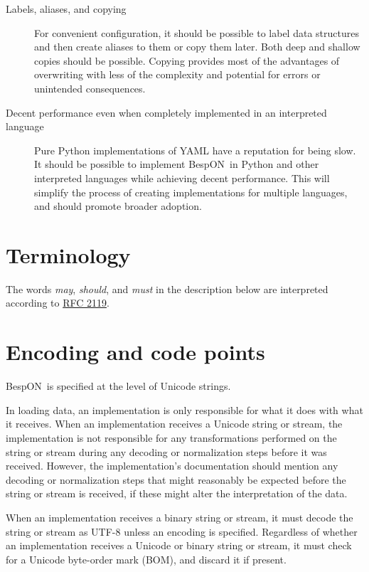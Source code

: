 \documentclass[11pt]{article}
\newcommand{\bespon}{BespON}
\begin{document}
\begin{description}
\item[Labels, aliases, and copying]  For convenient configuration, it should be possible to label data structures and then create aliases to them or copy them later.  Both deep and shallow copies should be possible.  Copying provides most of the advantages of overwriting with less of the complexity and potential for errors or unintended consequences.

\item[Decent performance even when completely implemented in an interpreted language]  Pure Python implementations of YAML have a reputation for being slow.  It should be possible to implement \bespon\ in Python and other interpreted languages while achieving decent performance.  This will simplify the process of creating implementations for multiple languages, and should promote broader adoption.
\end{description}




\section{Terminology}

The words \textit{may}, \textit{should}, and \textit{must} in the description below are interpreted according to \href{http://www.ietf.org/rfc/rfc2119.txt}{RFC 2119}.




\section{Encoding and code points}

\bespon\ is specified at the level of Unicode strings.

In loading data, an implementation is only responsible for what it does with what it receives.  When an implementation receives a Unicode string or stream, the implementation is not responsible for any transformations performed on the string or stream during any decoding or normalization steps before it was received.  However, the implementation's documentation should mention any decoding or normalization steps that might reasonably be expected before the string or stream is received, if these might alter the interpretation of the data.

When an implementation receives a binary string or stream, it must decode the string or stream as UTF-8 unless an encoding is specified.  Regardless of whether an implementation receives a Unicode or binary string or stream, it must check for a Unicode byte-order mark (BOM), and discard it if present.
\end{document}
